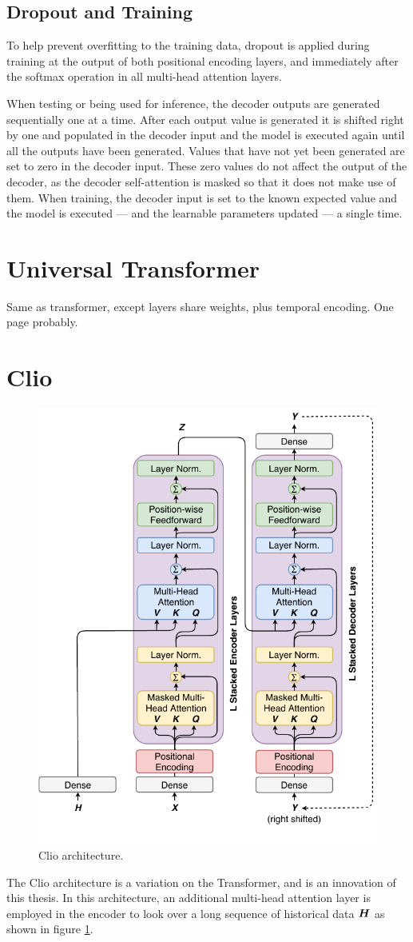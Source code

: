 \subsection{Dropout and Training}
To help prevent overfitting to the training data, dropout \cite{srivastava14a} is applied during training at the output of both positional encoding layers, and immediately after the softmax operation in all multi-head attention layers.

When testing or being used for inference, the decoder outputs are generated sequentially one at a time.
After each output value is generated it is shifted right by one and populated in the decoder input and the model is executed again until all the outputs have been generated.
Values that have not yet been generated are set to zero in the decoder input.
These zero values do not affect the output of the decoder, as the decoder self-attention is masked so that it does not make use of them.
When training, the decoder input is set to the known expected value and the model is executed --- and the learnable parameters updated --- a single time.

\section{Universal Transformer}
Same as transformer, except layers share weights, plus temporal encoding. One page probably.

\section{Clio}

\begin{figure}[htbp]
	\centerline{\includegraphics[width=.35\textwidth]{images/clio.pdf}}
	\caption{Clio architecture.}
	\label{fig:clio}
\end{figure}

The Clio architecture is a variation on the Transformer, and is an innovation of this thesis.
In this architecture, an additional multi-head attention layer is employed in the encoder to look over a long sequence of historical data ${\bm{H}}$ as shown in figure \ref{fig:clio}.

